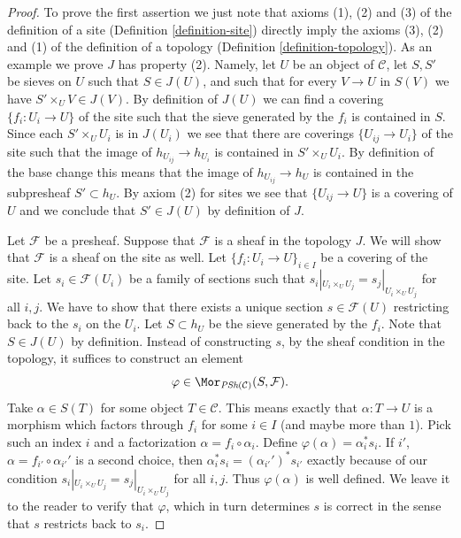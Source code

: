 \begin{proof}
To prove the first assertion we just note that axioms
(1), (2) and (3) of the definition of a site
(Definition \ref{definition-site})
directly imply the axioms
(3), (2) and (1) of the definition of a topology
(Definition \ref{definition-topology}). As an example we
prove $J$ has property (2). Namely, let $U$ be an object
of $\mathcal{C}$, let $S, S'$ be sieves on $U$ such that
$S \in J(U)$, and such that for every $V \to U$ in $S(V)$
we have $S' \times_U V \in J(V)$. By definition of $J(U)$
we can find a covering $\{f_i : U_i \to U\}$ of the site
such that the sieve generated by the $f_i$ is contained
in $S$. Since each $S'\times_U U_i$ is in $J(U_i)$ we
see that there are coverings $\{U_{ij} \to U_i\}$ of the
site such that the image of $h_{U_{ij}} \to h_{U_i}$ is contained
in $S' \times_U U_i$. By definition of the base change
this means that the image of $h_{U_{ij}} \to h_U$ is contained
in the subpresheaf $S' \subset h_U$. By axiom (2) for
sites we see that $\{U_{ij} \to U\}$ is a covering of
$U$ and we conclude that $S' \in J(U)$ by definition of $J$.

\medskip\noindent
Let $\mathcal{F}$ be a presheaf. Suppose that $\mathcal{F}$
is a sheaf in the topology $J$. We will show that $\mathcal{F}$
is a sheaf on the site as well. Let $\{f_i : U_i \to U\}_{i\in I}$
be a covering of the site. Let $s_i \in \mathcal{F}(U_i)$ be a
family of sections such that
$s_i|_{U_i \times_U U_j} = s_j|_{U_i \times_U U_j}$ for all
$i, j$. We have to show that there exists a unique section
$s \in \mathcal{F}(U)$ restricting back to the $s_i$ on the $U_i$.
Let $S \subset h_U$ be the sieve generated by the $f_i$.
Note that $S \in J(U)$ by definition. Instead of constructing
$s$, by the sheaf condition in the topology, it suffices
to construct an element
$$
\varphi \in \Mor_{\textit{PSh}(\mathcal{C})}(S, \mathcal{F}).
$$
Take $\alpha \in S(T)$ for some object $T \in \mathcal{C}$.
This means exactly that $\alpha : T \to U$ is a morphism
which factors through $f_i$ for some $i\in I$ (and maybe more than $1$).
Pick such an index $i$ and a factorization $\alpha = f_i \circ \alpha_i$.
Define $\varphi(\alpha) = \alpha_i^* s_i$. If $i'$, $\alpha
= f_{i'} \circ \alpha_{i'}'$ is a second choice, then
$\alpha_i^* s_i = (\alpha_{i'}')^* s_{i'}$ exactly because of our
condition $s_i|_{U_i \times_U U_j} = s_j|_{U_i \times_U U_j}$ for all
$i, j$. Thus $\varphi(\alpha)$ is well defined. We leave it to the reader
to verify that $\varphi$, which in turn determines $s$ is correct
in the sense that $s$ restricts back to $s_i$.


\end{proof}
